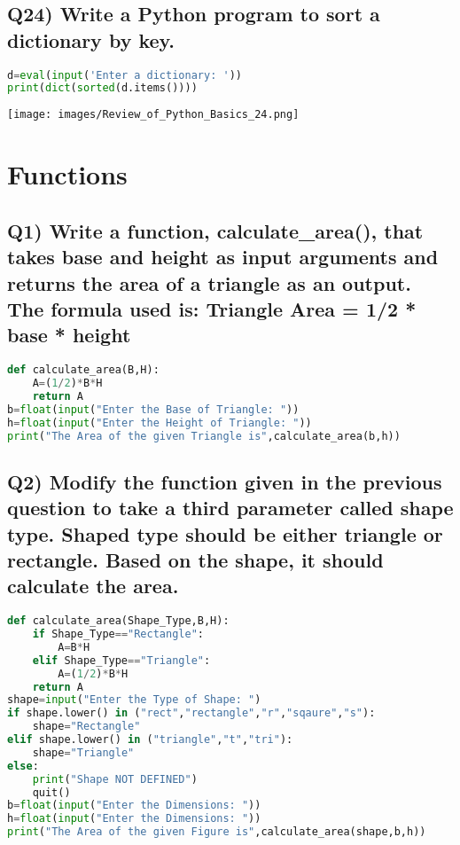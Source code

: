 \documentclass{article}
\begin{document}
\subsection*{Q24) Write a Python program to sort a dictionary by key.}
\begin{lstlisting}[language=Python]
d=eval(input('Enter a dictionary: '))
print(dict(sorted(d.items())))
\end{lstlisting}
\texttt{[image: images/Review\_of\_Python\_Basics\_24.png]}

\section{Functions}

\subsection*{Q1) Write a function, calculate\_area(), that takes base and height as input arguments and returns the area of a triangle as an output. The formula used is: Triangle Area = 1/2 * base * height}
\begin{lstlisting}[language=Python]
def calculate_area(B,H):
    A=(1/2)*B*H
    return A
b=float(input("Enter the Base of Triangle: "))
h=float(input("Enter the Height of Triangle: "))
print("The Area of the given Triangle is",calculate_area(b,h))
\end{lstlisting}

\subsection*{Q2) Modify the function given in the previous question to take a third parameter called shape type. Shaped type should be either triangle or rectangle. Based on the shape, it should calculate the area.}
\begin{lstlisting}[language=Python]
def calculate_area(Shape_Type,B,H):
    if Shape_Type=="Rectangle":
        A=B*H
    elif Shape_Type=="Triangle":
        A=(1/2)*B*H
    return A
shape=input("Enter the Type of Shape: ")
if shape.lower() in ("rect","rectangle","r","sqaure","s"):
    shape="Rectangle"
elif shape.lower() in ("triangle","t","tri"):
    shape="Triangle"
else:
    print("Shape NOT DEFINED")
    quit()
b=float(input("Enter the Dimensions: "))
h=float(input("Enter the Dimensions: "))
print("The Area of the given Figure is",calculate_area(shape,b,h))
\end{lstlisting}
\end{document}
